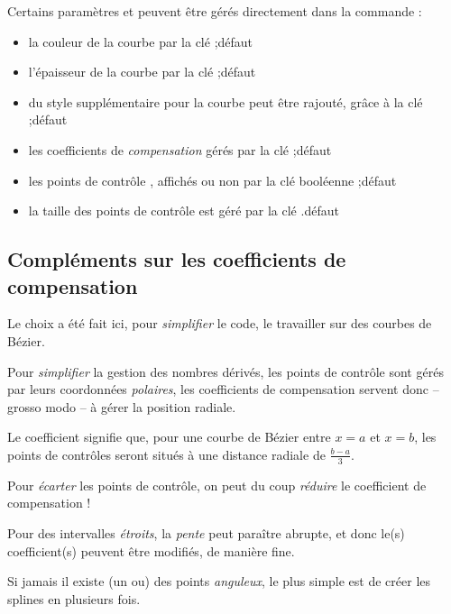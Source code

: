 \begin{cautionblock}
Certains paramètres et  peuvent être gérés directement dans la commande  :
%
\begin{itemize}
	\item la couleur de la courbe par la {clé}  ;\hfill{}défaut 
	\item l'épaisseur de la courbe par la {clé}  ;\hfill{}défaut \Cle{1.25pt}
	\item du style supplémentaire pour la courbe peut être rajouté, grâce à la {clé}  ;\hfill{}défaut 
	\item les coefficients de \textit{compensation} gérés par la {clé}  ;\hfill{}défaut 
	\item les points de contrôle , affichés ou non par la {clé booléenne}  ;\hfill{}défaut 
	\item la taille des points de contrôle est géré par la {clé} .\hfill{}défaut \Cle{2pt}
\end{itemize}
\vspace*{-\baselineskip}\leavevmode
\end{cautionblock}

\subsection{Compléments sur les coefficients de \og compensation \fg}

\begin{tipblock}
Le choix a été fait ici, pour \textit{simplifier} le code, le travailler sur des courbes de Bézier.

Pour \textit{simplifier} la gestion des nombres dérivés, les points de contrôle sont gérés par leurs coordonnées \textit{polaires}, les \textsf{coefficients de compensation} servent donc -- grosso modo -- à gérer la position radiale.

\smallskip

Le coefficient  signifie que, pour une courbe de Bézier entre $x=a$ et $x=b$, les points de contrôles seront situés à une distance radiale de $\frac{b-a}{3}$.

Pour \textit{écarter} les points de contrôle, on peut du coup \textit{réduire} le coefficient de compensation !

\medskip

Pour des intervalles \textit{étroits}, la \textit{pente} peut paraître abrupte, et donc le(s) coefficient(s) peuvent être modifiés, de manière fine.

\medskip

Si jamais il existe (un ou) des points \textit{anguleux}, le plus simple est de créer les splines en plusieurs fois.
\end{tipblock}


